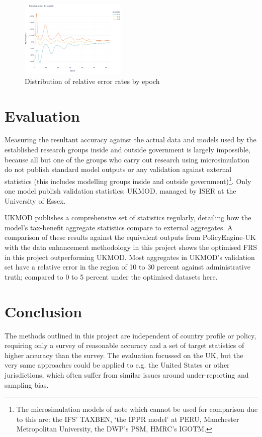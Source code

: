 \documentclass[10pt,journal,compsoc]{IEEEtran}
\begin{document}
\begin{figure}[!ht]
  \centering
  \includegraphics[width=0.45\textwidth]{rel_error_training.png}
  \caption{Distribution of relative error rates by epoch}
  \label{fig:rel_error_training}
\end{figure}

\section{Evaluation}

Measuring the resultant accuracy against the actual data and models used by the established research groups inside and outside government is largely impossible, because all but one of the groups who carry out research using microsimulation do not publish standard model outputs or any validation against external statistics (this includes modelling groups inside and outside government)\footnote{The microsimulation models of note which cannot be used for comparison due to this are: the IFS' TAXBEN, `the IPPR model' at PERU, Manchester Metropolitan University, the DWP's PSM, HMRC's IGOTM.}. Only one model publish validation statistics: UKMOD, managed by ISER at the University of Essex.

UKMOD publishes a comprehensive set of statistics regularly, detailing how the model's tax-benefit aggregate statistics compare to external aggregates.\cite{ukmod_country_report} A comparison of these results against the equivalent outputs from PolicyEngine-UK with the data enhancement methodology in this project shows the optimised FRS in this project outperforming UKMOD. Most aggregates in UKMOD's validation set have a relative error in the region of 10 to 30 percent against administrative truth; compared to 0 to 5 percent under the optimised datasets here.

\section{Conclusion}

The methods outlined in this project are independent of country profile or policy, requiring only a survey of reasonable accuracy and a set of target statistics of higher accuracy than the survey. The evaluation focussed on the UK, but the very same approaches could be applied to e.g. the United States or other jurisdictions, which often suffer from similar issues around under-reporting and sampling bias.
\end{document}
